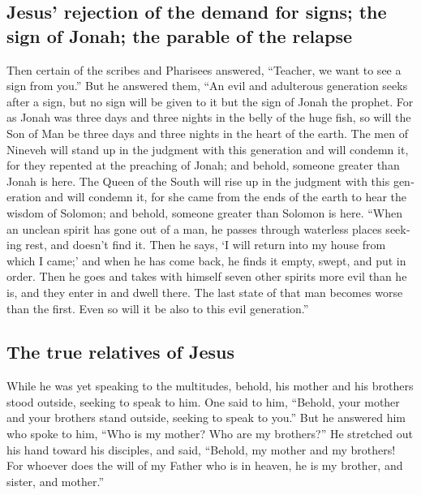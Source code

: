 \begin{paracol}{2}
\begin{otherlanguage}{english}
\hypertarget{jesus-rejection-of-the-demand-for-signs-the-sign-of-jonah-the-parable-of-the-relapse}{%
\subsection{Jesus' rejection of the demand for signs; the sign of Jonah;
the parable of the
relapse}\label{jesus-rejection-of-the-demand-for-signs-the-sign-of-jonah-the-parable-of-the-relapse}}

 Then certain of the scribes and Pharisees answered,
``Teacher, we want to see a sign from you.''  But he
answered them, ``An evil and adulterous generation seeks after a sign,
but no sign will be given to it but the sign of Jonah the prophet.
 For as Jonah was three days and three nights in the
belly of the huge fish, so will the Son of Man be three days and three
nights in the heart of the earth.  The men of Nineveh
will stand up in the judgment with this generation and will condemn it,
for they repented at the preaching of Jonah; and behold, someone greater
than Jonah is here.  The Queen of the South will rise up
in the judgment with this generation and will condemn it, for she came
from the ends of the earth to hear the wisdom of Solomon; and behold,
someone greater than Solomon is here.  ``When an unclean
spirit has gone out of a man, he passes through waterless places seeking
rest, and doesn't find it.  Then he says, `I will return
into my house from which I came;' and when he has come back, he finds it
empty, swept, and put in order.  Then he goes and takes
with himself seven other spirits more evil than he is, and they enter in
and dwell there. The last state of that man becomes worse than the
first. Even so will it be also to this evil generation.''

\hypertarget{the-true-relatives-of-jesus}{%
\subsection{The true relatives of
Jesus}\label{the-true-relatives-of-jesus}}

 While he was yet speaking to the multitudes, behold, his
mother and his brothers stood outside, seeking to speak to him.
 One said to him, ``Behold, your mother and your brothers
stand outside, seeking to speak to you.''  But he
answered him who spoke to him, ``Who is my mother? Who are my
brothers?''  He stretched out his hand toward his
disciples, and said, ``Behold, my mother and my brothers!
 For whoever does the will of my Father who is in heaven,
he is my brother, and sister, and mother.''


\end{otherlanguage}
\end{paracol}
